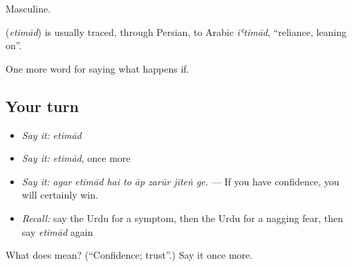 Masculine.

\begin{cousinweb}
\textbf{} (\emph{etimād}) is usually traced, through Persian, to Arabic \emph{iʿtimād}, \textquotedblleft{}reliance, leaning on\textquotedblright{}.
\end{cousinweb}

\begin{grammarlens}[title={What you've built}]
One more word for saying what happens if.
\end{grammarlens}

\subsection*{Your turn}
\begin{itemize}
\raggedright
  \item \emph{Say it:} \emph{etimād}
  \item \emph{Say it:} \emph{etimād}, once more
  \item \emph{Say it:} \emph{agar etimād hai to āp zarūr jīteṅ ge.} — If you have confidence, you will certainly win.
  \item \emph{Recall:} say the Urdu for a symptom, then the Urdu for a nagging fear, then say \emph{etimād} again
\end{itemize}

\begin{tcolorbox}[breakable,colback=teal!4,colframe=teal!35!black,title={Before you move on}]
What does  mean? (\textquotedblleft{}Confidence; trust\textquotedblright{}.) Say it once more.
\end{tcolorbox}
